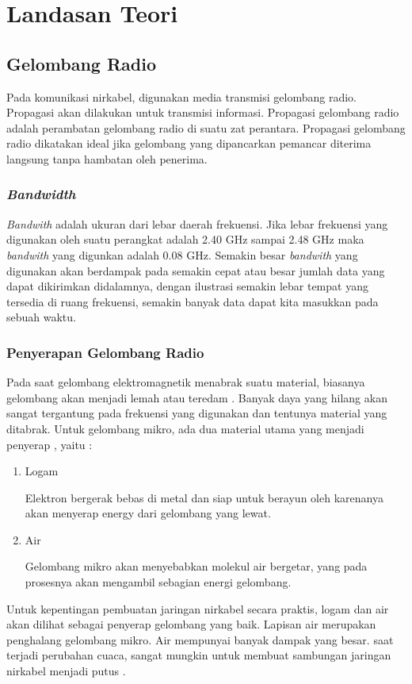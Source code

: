 \documentclass[12pt,a4paper]{report}
\begin{document}
		\chapter{Landasan Teori}
		\section{Gelombang Radio}
		Pada komunikasi nirkabel, digunakan media transmisi gelombang radio. Propagasi akan dilakukan untuk transmisi informasi. Propagasi gelombang radio adalah perambatan gelombang radio di suatu zat perantara. Propagasi gelombang radio dikatakan ideal jika gelombang yang dipancarkan pemancar diterima langsung tanpa hambatan oleh penerima.
		\subsection{\emph{Bandwidth}}
		\emph{Bandwith} adalah ukuran dari lebar daerah frekuensi. Jika lebar frekuensi yang digunakan oleh suatu perangkat adalah 2.40 GHz sampai 2.48 GHz maka \emph{bandwith} yang digunkan adalah 0.08 GHz. Semakin besar \emph{bandwith} yang digunakan akan berdampak pada semakin cepat atau besar jumlah data yang dapat dikirimkan didalamnya, dengan ilustrasi semakin lebar tempat yang tersedia di ruang frekuensi, semakin banyak data dapat kita masukkan pada sebuah waktu.\cite{Hartono2011}
		\subsection{Penyerapan Gelombang Radio}
		Pada saat gelombang elektromagnetik menabrak suatu material, biasanya gelombang akan menjadi lemah atau teredam \cite{Setiadi2013}. Banyak daya yang hilang akan sangat tergantung pada frekuensi yang digunakan dan tentunya material yang ditabrak. Untuk gelombang mikro, ada dua material utama yang menjadi penyerap \cite{Setiadi2013}, yaitu :
		\begin{enumerate}
			\item Logam
			
			Elektron bergerak bebas di metal dan siap untuk berayun oleh karenanya akan menyerap energy dari gelombang yang lewat.
			
			\item Air
			
			Gelombang mikro akan menyebabkan molekul air bergetar, yang pada prosesnya akan mengambil sebagian energi gelombang.
		\end{enumerate}
		Untuk kepentingan pembuatan jaringan nirkabel secara praktis, logam dan air akan dilihat sebagai penyerap gelombang yang baik. Lapisan air merupakan penghalang gelombang mikro. Air mempunyai banyak dampak yang besar. saat terjadi perubahan cuaca, sangat mungkin untuk membuat sambungan jaringan nirkabel menjadi putus \cite{Setiadi2013}.
		
\end{document}
